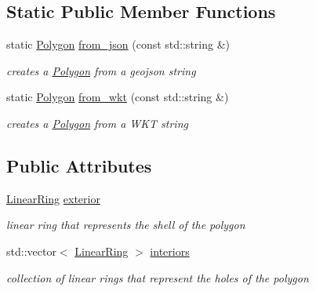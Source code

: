 \subsection*{Static Public Member Functions}
\begin{DoxyCompactItemize}
\item 
static \hyperlink{classsimo_1_1shapes_1_1_polygon}{Polygon} \hyperlink{classsimo_1_1shapes_1_1_polygon_a9fdf028143aa6849082458f9f4c95e4e}{from\-\_\-json} (const std\-::string \&)
\begin{DoxyCompactList}\small\item\em creates a \hyperlink{classsimo_1_1shapes_1_1_polygon}{Polygon} from a geojson string \end{DoxyCompactList}\item 
static \hyperlink{classsimo_1_1shapes_1_1_polygon}{Polygon} \hyperlink{classsimo_1_1shapes_1_1_polygon_a60178ce736c8cf87026d5730c73876cf}{from\-\_\-wkt} (const std\-::string \&)
\begin{DoxyCompactList}\small\item\em creates a \hyperlink{classsimo_1_1shapes_1_1_polygon}{Polygon} from a W\-K\-T string \end{DoxyCompactList}\end{DoxyCompactItemize}
\subsection*{Public Attributes}
\begin{DoxyCompactItemize}
\item 
\hypertarget{classsimo_1_1shapes_1_1_polygon_ab7f8d277bfe2342521ec9c35661ff692}{\hyperlink{classsimo_1_1shapes_1_1_linear_ring}{Linear\-Ring} \hyperlink{classsimo_1_1shapes_1_1_polygon_ab7f8d277bfe2342521ec9c35661ff692}{exterior}}\label{classsimo_1_1shapes_1_1_polygon_ab7f8d277bfe2342521ec9c35661ff692}

\begin{DoxyCompactList}\small\item\em linear ring that represents the shell of the polygon \end{DoxyCompactList}\item 
\hypertarget{classsimo_1_1shapes_1_1_polygon_a94f2f05198bd29714d9ecf6d60b83c2d}{std\-::vector$<$ \hyperlink{classsimo_1_1shapes_1_1_linear_ring}{Linear\-Ring} $>$ \hyperlink{classsimo_1_1shapes_1_1_polygon_a94f2f05198bd29714d9ecf6d60b83c2d}{interiors}}\label{classsimo_1_1shapes_1_1_polygon_a94f2f05198bd29714d9ecf6d60b83c2d}

\begin{DoxyCompactList}\small\item\em collection of linear rings that represent the holes of the polygon \end{DoxyCompactList}\end{DoxyCompactItemize}


